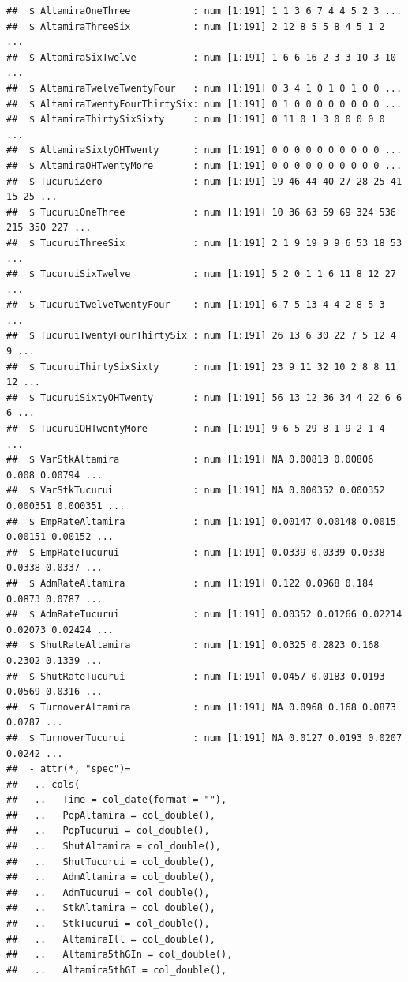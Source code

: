 \documentclass[
]{article}
\begin{document}
\begin{verbatim}
##  $ AltamiraOneThree           : num [1:191] 1 1 3 6 7 4 4 5 2 3 ...
##  $ AltamiraThreeSix           : num [1:191] 2 12 8 5 5 8 4 5 1 2 ...
##  $ AltamiraSixTwelve          : num [1:191] 1 6 6 16 2 3 3 10 3 10 ...
##  $ AltamiraTwelveTwentyFour   : num [1:191] 0 3 4 1 0 1 0 1 0 0 ...
##  $ AltamiraTwentyFourThirtySix: num [1:191] 0 1 0 0 0 0 0 0 0 0 ...
##  $ AltamiraThirtySixSixty     : num [1:191] 0 11 0 1 3 0 0 0 0 0 ...
##  $ AltamiraSixtyOHTwenty      : num [1:191] 0 0 0 0 0 0 0 0 0 0 ...
##  $ AltamiraOHTwentyMore       : num [1:191] 0 0 0 0 0 0 0 0 0 0 ...
##  $ TucuruiZero                : num [1:191] 19 46 44 40 27 28 25 41 15 25 ...
##  $ TucuruiOneThree            : num [1:191] 10 36 63 59 69 324 536 215 350 227 ...
##  $ TucuruiThreeSix            : num [1:191] 2 1 9 19 9 9 6 53 18 53 ...
##  $ TucuruiSixTwelve           : num [1:191] 5 2 0 1 1 6 11 8 12 27 ...
##  $ TucuruiTwelveTwentyFour    : num [1:191] 6 7 5 13 4 4 2 8 5 3 ...
##  $ TucuruiTwentyFourThirtySix : num [1:191] 26 13 6 30 22 7 5 12 4 9 ...
##  $ TucuruiThirtySixSixty      : num [1:191] 23 9 11 32 10 2 8 8 11 12 ...
##  $ TucuruiSixtyOHTwenty       : num [1:191] 56 13 12 36 34 4 22 6 6 6 ...
##  $ TucuruiOHTwentyMore        : num [1:191] 9 6 5 29 8 1 9 2 1 4 ...
##  $ VarStkAltamira             : num [1:191] NA 0.00813 0.00806 0.008 0.00794 ...
##  $ VarStkTucurui              : num [1:191] NA 0.000352 0.000352 0.000351 0.000351 ...
##  $ EmpRateAltamira            : num [1:191] 0.00147 0.00148 0.0015 0.00151 0.00152 ...
##  $ EmpRateTucurui             : num [1:191] 0.0339 0.0339 0.0338 0.0338 0.0337 ...
##  $ AdmRateAltamira            : num [1:191] 0.122 0.0968 0.184 0.0873 0.0787 ...
##  $ AdmRateTucurui             : num [1:191] 0.00352 0.01266 0.02214 0.02073 0.02424 ...
##  $ ShutRateAltamira           : num [1:191] 0.0325 0.2823 0.168 0.2302 0.1339 ...
##  $ ShutRateTucurui            : num [1:191] 0.0457 0.0183 0.0193 0.0569 0.0316 ...
##  $ TurnoverAltamira           : num [1:191] NA 0.0968 0.168 0.0873 0.0787 ...
##  $ TurnoverTucurui            : num [1:191] NA 0.0127 0.0193 0.0207 0.0242 ...
##  - attr(*, "spec")=
##   .. cols(
##   ..   Time = col_date(format = ""),
##   ..   PopAltamira = col_double(),
##   ..   PopTucurui = col_double(),
##   ..   ShutAltamira = col_double(),
##   ..   ShutTucurui = col_double(),
##   ..   AdmAltamira = col_double(),
##   ..   AdmTucurui = col_double(),
##   ..   StkAltamira = col_double(),
##   ..   StkTucurui = col_double(),
##   ..   AltamiraIll = col_double(),
##   ..   Altamira5thGIn = col_double(),
##   ..   Altamira5thGI = col_double(),

\end{verbatim}
\end{document}
